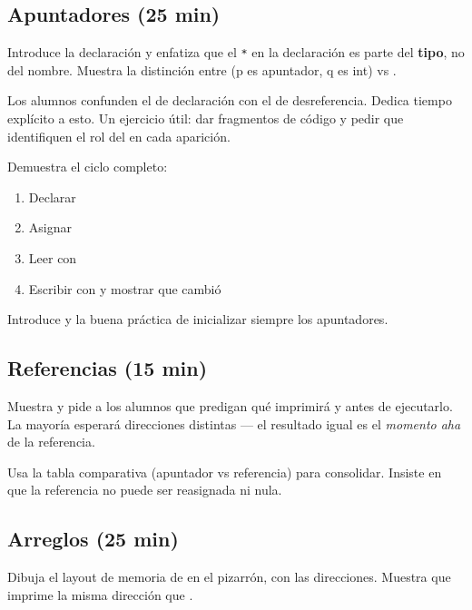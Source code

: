 \documentclass[12pt, oneside]{article}
\begin{document}
\subsection{Apuntadores (25 min)}

Introduce la declaración  y enfatiza que el \texttt{*} en la
declaración es parte del \textbf{tipo}, no del nombre. Muestra la distinción
entre  (p es apuntador, q es int) vs .

\begin{notaprofesor}
  Los alumnos confunden el \cpp{*} de declaración con el \cpp{*} de
  desreferencia. Dedica tiempo explícito a esto. Un ejercicio útil: dar
  fragmentos de código y pedir que identifiquen el rol del \cpp{*} en cada
  aparición.
\end{notaprofesor}

Demuestra el ciclo completo:
\begin{enumerate}
  \item Declarar 
  \item Asignar 
  \item Leer con 
  \item Escribir con  y mostrar que  cambió
\end{enumerate}

Introduce  y la buena práctica de inicializar siempre los
apuntadores.

\subsection{Referencias (15 min)}

Muestra  y pide a los alumnos que predigan qué imprimirá
 y  antes de ejecutarlo. La mayoría esperará direcciones
distintas — el resultado igual es el \textit{momento aha} de la referencia.

Usa la tabla comparativa (apuntador vs referencia) para consolidar. Insiste
en que la referencia no puede ser reasignada ni nula.

\subsection{Arreglos (25 min)}

Dibuja el layout de memoria de  en el
pizarrón, con las direcciones. Muestra que  imprime la misma
dirección que .
\end{document}
